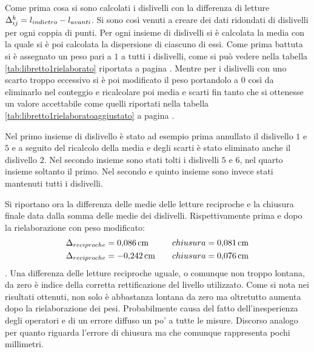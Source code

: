 Come prima cosa si sono calcolati i dislivelli con la differenza di letture $\Delta_{ij}^{k}=\break l_{indietro}-l_{avanti}$. %
Si sono così venuti a creare dei dati ridondati di dislivelli per ogni coppia di punti.
Per ogni insieme di dislivelli si è calcolata la media con la quale si è poi calcolata la dispersione di ciascuno di essi.
Come prima battuta si è assegnato un peso pari a $1$ a tutti i dislivelli, come si può vedere nella tabella \ref{tab:libretto1rielaborato} riportata a pagina \pageref{tab:libretto1rielaborato}.
Mentre per i dislivelli con uno scarto troppo eccessivo si è poi modificato il peso portandolo a $0$ così da eliminarlo nel conteggio e ricalcolare poi media e scarti fin tanto che si ottenesse un valore accettabile come quelli riportati nella tabella \ref{tab:libretto1rielaboratoaggiustato} a pagina \pageref{tab:libretto1rielaboratoaggiustato}.

Nel primo insieme di dislivello è stato ad esempio prima annullato il dislivello $1$ e $5$ e a seguito del ricalcolo della media e degli scarti è stato eliminato anche il dislivello $2$.
Nel secondo insieme sono stati tolti i dislivelli $5$ e $6$, nel quarto insieme soltanto il primo. 
Nel secondo e quinto insieme sono invece stati mantenuti tutti i dislivelli.

Si riportano ora la differenza delle medie delle letture reciproche e la chiusura finale data dalla somma delle medie dei dislivelli. Rispettivamente prima e dopo la rielaborazione con peso modificato:
\begin{align*}
\Delta_{reciproche} &= \SI{0.086}{\centi\metre} \quad & chiusura = \SI{0.081}{\centi\metre} \\
\Delta_{reciproche} &= \SI{-0.242}{\centi\metre} \quad & chiusura = \SI{0.076}{\centi\metre}
\end{align*}.
Una differenza delle letture reciproche uguale, o comunque non troppo lontana, da zero è indice della corretta rettificazione del livello utilizzato. 
Come si nota nei risultati ottenuti, non solo è abbastanza lontana da zero ma oltretutto aumenta dopo la rielaborazione dei pesi. 
Probabilmente causa del fatto dell'inesperienza degli operatori e di un errore diffuso un po' a tutte le misure.
Discorso analogo per quanto riguarda l'errore di chiusura ma che comunque rappresenta pochi millimetri.

